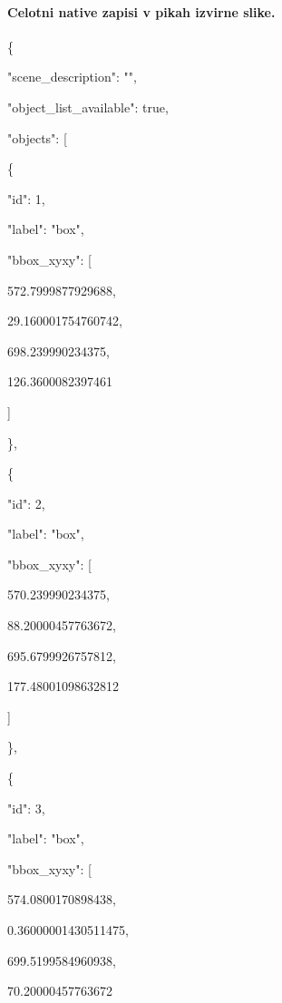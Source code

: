 \documentclass[10pt,a4paper]{article}
\begin{document}
\paragraph{Celotni native zapisi v pikah izvirne slike.}
\{\par
  "scene\_description":\allowbreak{} "",\allowbreak{}\par
  "object\_list\_available":\allowbreak{} true,\allowbreak{}\par
  "objects":\allowbreak{} [\par
    \{\par
      "id":\allowbreak{} 1,\allowbreak{}\par
      "label":\allowbreak{} "box",\allowbreak{}\par
      "bbox\_xyxy":\allowbreak{} [\par
        572.7999877929688,\allowbreak{}\par
        29.160001754760742,\allowbreak{}\par
        698.239990234375,\allowbreak{}\par
        126.3600082397461\par
      ]\par
    \},\allowbreak{}\par
    \{\par
      "id":\allowbreak{} 2,\allowbreak{}\par
      "label":\allowbreak{} "box",\allowbreak{}\par
      "bbox\_xyxy":\allowbreak{} [\par
        570.239990234375,\allowbreak{}\par
        88.20000457763672,\allowbreak{}\par
        695.6799926757812,\allowbreak{}\par
        177.48001098632812\par
      ]\par
    \},\allowbreak{}\par
    \{\par
      "id":\allowbreak{} 3,\allowbreak{}\par
      "label":\allowbreak{} "box",\allowbreak{}\par
      "bbox\_xyxy":\allowbreak{} [\par
        574.0800170898438,\allowbreak{}\par
        0.36000001430511475,\allowbreak{}\par
        699.5199584960938,\allowbreak{}\par
        70.20000457763672\par
\end{document}
